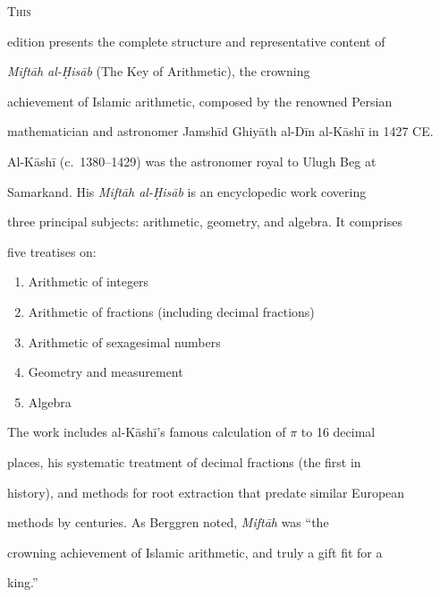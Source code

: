 \documentclass[11pt,a4paper]{article}
\begin{document}



\lettrine[lines=3, nindent=0em, findent=3pt]{\color{chapcolor}T}{his}

edition presents the complete structure and representative content of

\textit{Mift\=ah al-\d{H}is\=ab} (The Key of Arithmetic), the crowning

achievement of Islamic arithmetic, composed by the renowned Persian

mathematician and astronomer Jamsh\=id Ghiy\=ath al-D\=in al-K\=ash\=i in 1427 CE.



Al-K\=ash\=i (c.\ 1380--1429) was the astronomer royal to Ulugh Beg at

Samarkand. His \textit{Mift\=ah al-\d{H}is\=ab} is an encyclopedic work covering

three principal subjects: arithmetic, geometry, and algebra. It comprises

five treatises on:

\begin{enumerate}[nosep]

  \item Arithmetic of integers

  \item Arithmetic of fractions (including decimal fractions)

  \item Arithmetic of sexagesimal numbers

  \item Geometry and measurement

  \item Algebra

\end{enumerate}



The work includes al-K\=ash\=i's famous calculation of $\pi$ to 16 decimal

places, his systematic treatment of decimal fractions (the first in

history), and methods for root extraction that predate similar European

methods by centuries. As Berggren noted, \textit{Mift\=ah} was ``the

crowning achievement of Islamic arithmetic, and truly a gift fit for a

king.''
\end{document}
